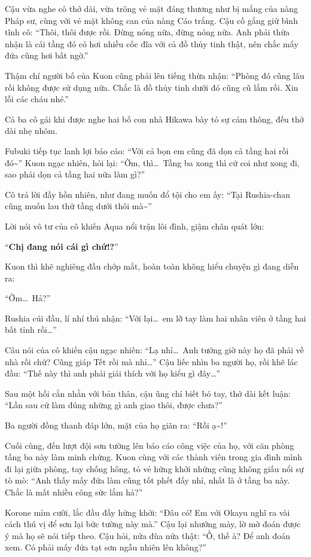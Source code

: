 \documentclass[../main.tex]{subfiles}
\begin{document}
Cậu vừa nghe cô thở dài, vừa trông vẻ mặt đáng thương như bị mắng của nàng Pháp sư, cùng với vẻ mặt không can của nàng Cáo trắng. Cậu cố gắng giữ bình tĩnh cô: ``Thôi, thôi được rồi. Đừng nóng nữa, đừng nóng nữa. Anh phải thừa nhận là cái tầng đó có hơi nhiều cốc đĩa với cả đồ thủy tinh thật, nên chắc mấy đứa cũng hơi bất ngờ.''

Thậm chí người bố của Kuon cũng phải lên tiếng thừa nhận: ``Phòng đó cũng lâu rồi không được sử dụng nữa. Chắc là đồ thủy tinh dưới đó cũng cũ lắm rồi. Xin lỗi các cháu nhé.''

Cả ba cô gái khi được nghe hai bố con nhà Hikawa bày tỏ sự cảm thông, đều thở dài nhẹ nhõm.

Fubuki tiếp tục lanh lợi báo cáo: ``Với cả bọn em cũng đã dọn cả tầng hai rồi đó\~{}'' Kuon ngạc nhiên, hỏi lại: ``Ờm, thì\dots\ Tầng ba xong thì cứ coi như xong đi, sao phải dọn cả tầng hai nữa làm gì?''

Cô trả lời đầy hồn nhiên, như đang muốn đổ tội cho em ấy: ``Tại Rushia-chan cũng muốn lau thử tầng dưới thôi mà\~{}''

Lời nói vô tư của cô khiến Aqua nổi trận lôi đình, giậm chân quát lớn:

``\textbf{Chị đang nói cái gì chứ!?}''

Kuon thì khẽ nghiêng đầu chớp mắt, hoàn toàn không hiểu chuyện gì đang diễn ra:

``Ờm\dots\ Hả?''

Rushia cúi đầu, lí nhí thú nhận: ``Với lại\dots\ em lỡ tay làm hai nhân viên ở tầng hai bất tỉnh rồi\dots''

Câu nói của cô khiến cậu ngạc nhiên: ``Lạ nhỉ\dots\ Anh tưởng giờ này họ đã phải về nhà rồi chứ? Cũng giáp Tết rồi mà nhỉ\dots'' Cậu liếc nhìn ba người họ, rồi khẽ lác đầu: ``Thế này thì anh phải giải thích với họ kiểu gì đây\dots''

Sau một hồi cằn nhằn với bản thân, cậu ũng chỉ biết bó tay, thở dài kết luận: ``Lần sau cứ làm đúng những gì anh giao thôi, được chưa?''

Ba người đồng thanh đáp lớn, mặt của họ giãn ra: ``Rồi ạ\~{}!''

Cuối cùng, đến lượt đội sơn tường lên báo cáo công việc của họ, với căn phòng tầng ba này làm minh chứng. Kuon cùng với các thành viên trong gia đình mình đi lại giữa phòng, tay chống hông, tỏ vẻ hứng khởi những cũng không giấu nổi sự tò mò: ``Anh thấy mấy đứa làm cũng tốt phết đấy nhỉ, nhất là ở tầng ba này. Chắc là mất nhiều công sức lắm hả?''

Korone mỉm cười, lắc đầu đầy hứng khởi: ``Đâu có! Em với Okayu nghĩ ra vài cách thú vị để sơn lại bức tường này mà.'' Cậu lại nhướng mày, lờ mờ đoán được ý mà họ sẽ nói tiếp theo. Cậu hỏi, nửa đùa nửa thật: ``Ồ, thế à? Để anh đoán xem. Có phải mấy đứa tạt sơn ngẫu nhiên lên không?''
\end{document}
